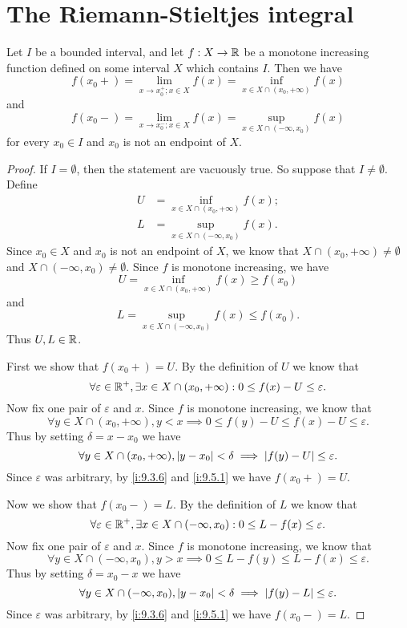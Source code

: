 \section{The Riemann-Stieltjes integral}\label{i:sec:11.8}

\begin{ac}\label{i:ac:11.8.1}
  Let \(I\) be a bounded interval, and let \(f : X \to \mathbb{R}\) be a monotone increasing function defined on some interval \(X\) which contains \(I\).
  Then we have
  \[
    f(x_0+) = \lim_{x \to x_0^+ ; x \in X} f(x) = \inf_{x \in X \cap (x_0, +\infty)} f(x)
  \]
  and
  \[
    f(x_0-) = \lim_{x \to x_0^- ; x \in X} f(x) = \sup_{x \in X \cap (-\infty, x_0)} f(x)
  \]
  for every \(x_0 \in I\) and \(x_0\) is not an endpoint of \(X\).
\end{ac}

\begin{proof}
  If \(I = \emptyset\), then the statement are vacuously true.
  So suppose that \(I \neq \emptyset\).
  Define
  \begin{align*}
    U & = \inf_{x \in X \cap (x_0, +\infty)} f(x); \\
    L & = \sup_{x \in X \cap (-\infty, x_0)} f(x).
  \end{align*}
  Since \(x_0 \in X\) and \(x_0\) is not an endpoint of \(X\), we know that \(X \cap (x_0, +\infty) \neq \emptyset\) and \(X \cap (-\infty, x_0) \neq \emptyset\).
  Since \(f\) is monotone increasing, we have
  \[
    U = \inf_{x \in X \cap (x_0, +\infty)} f(x) \geq f(x_0)
  \]
  and
  \[
    L = \sup_{x \in X \cap (-\infty, x_0)} f(x) \leq f(x_0).
  \]
  Thus \(U, L \in \mathbb{R}\).

  First we show that \(f(x_0+) = U\).
  By the definition of \(U\) we know that
  \[
    \forall \varepsilon \in \mathbb{R}^+, \exists x \in X \cap (x_0, +\infty) : 0 \leq f(x) - U \leq \varepsilon.
  \]
  Now fix one pair of \(\varepsilon\) and \(x\).
  Since \(f\) is monotone increasing, we know that
  \[
    \forall y \in X \cap (x_0, +\infty), y < x \implies 0 \leq f(y) - U \leq f(x) - U \leq \varepsilon.
  \]
  Thus by setting \(\delta = x - x_0\) we have
  \[
    \forall y \in X \cap (x_0, +\infty), \left\lvert y - x_0\right\rvert < \delta \implies \left\lvert f(y) - U\right\rvert \leq \varepsilon.
  \]
  Since \(\varepsilon\) was arbitrary, by \cref{i:9.3.6} and \cref{i:9.5.1} we have \(f(x_0+) = U\).

  Now we show that \(f(x_0-) = L\).
  By the definition of \(L\) we know that
  \[
    \forall \varepsilon \in \mathbb{R}^+, \exists x \in X \cap (-\infty, x_0) : 0 \leq L - f(x) \leq \varepsilon.
  \]
  Now fix one pair of \(\varepsilon\) and \(x\).
  Since \(f\) is monotone increasing, we know that
  \[
    \forall y \in X \cap (-\infty, x_0), y > x \implies 0 \leq L - f(y) \leq L - f(x) \leq \varepsilon.
  \]
  Thus by setting \(\delta = x_0 - x\) we have
  \[
    \forall y \in X \cap (-\infty, x_0), \left\lvert y - x_0\right\rvert < \delta \implies \left\lvert f(y) - L\right\rvert \leq \varepsilon.
  \]
  Since \(\varepsilon\) was arbitrary, by \cref{i:9.3.6} and \cref{i:9.5.1} we have \(f(x_0-) = L\).
\end{proof}

